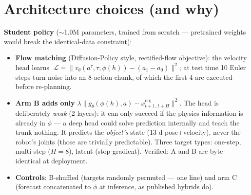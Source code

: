 \documentclass[10pt]{article}
\begin{document}
\section{Architecture choices (and why)}
\begin{center}
\end{center}

\textbf{Student policy} ($\sim$1.0M parameters, trained from scratch --- pretrained
weights would break the identical-data constraint):
\begin{itemize}
\item \textbf{Flow matching} (Diffusion-Policy style, rectified-flow objective):
the velocity head learns
$\;\mathcal{L}=\lVert v_\theta(a^\tau,\tau,\phi(h))-(a_1-a_0)\rVert^2$;
at test time 10 Euler steps turn noise into an 8-action chunk, of which the first
4 are executed before re-planning.
\item \textbf{Arm B adds only} $\lambda\lVert g_\theta(\phi(h),a)-x^{\text{obj}}_{t+1..t+H}\rVert^2$.
The head is deliberately \emph{weak} (2 layers): it can only succeed if the physics
information is already in $\phi$ --- a deep head could solve prediction internally
and teach the trunk nothing. It predicts the \emph{object's} state (13-d pose+velocity),
never the robot's joints (those are trivially predictable). Three target types:
one-step, multi-step ($H{=}8$), latent (stop-gradient). Verified: A and B are
byte-identical at deployment.
\item \textbf{Controls}: B-shuffled (targets randomly permuted --- one line) and
arm C (forecast concatenated to $\phi$ at inference, as published hybrids do).
\end{itemize}
\end{document}
